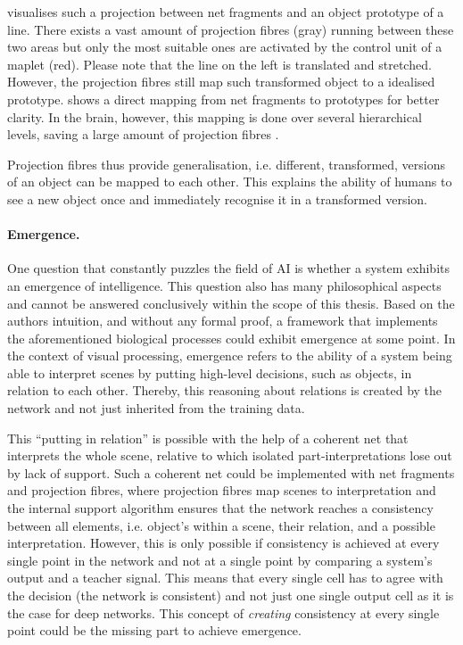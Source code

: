  visualises such a projection between net fragments and an object prototype of a line. There exists a vast amount of projection fibres (gray) running between these two areas but only the most suitable ones are activated by the control unit of a maplet (red).
Please note that the line on the left is translated and stretched. However, the projection fibres still map such transformed object to a idealised prototype.
 shows a direct mapping from net fragments to prototypes for better clarity. In the brain, however, this mapping is done over several hierarchical levels, saving a large amount of projection fibres .

Projection fibres thus provide generalisation, i.e. different, transformed, versions of an object can be mapped to each other. This explains the ability of humans to see a new object once and immediately recognise it in a transformed version.

\paragraph{Emergence.} One question that constantly puzzles the field of AI is whether a system exhibits an emergence of intelligence.
This question also has many philosophical aspects and cannot be answered conclusively within the scope of this thesis.
Based on the authors intuition, and without any formal proof, a framework that implements the aforementioned biological processes could exhibit emergence at some point.
In the context of visual processing, emergence refers to the ability of a system being able to interpret scenes by putting high-level decisions, such as objects, in relation to each other. Thereby, this reasoning about relations is created by the network and not just inherited from the training data.

This ``putting in relation'' is possible with the help of a coherent net that interprets the whole scene, relative to which isolated part-interpretations lose out by lack of support. Such a coherent net could be implemented with net fragments and projection fibres, where projection fibres map scenes to interpretation and the internal support algorithm ensures that the network reaches a consistency between all elements, i.e. object's within a scene, their relation, and a possible interpretation.
However, this is only possible if consistency is achieved at every single point in the network and not at a single point by comparing a system's output and a teacher signal.
This means that every single cell has to agree with the decision (the network is consistent) and not just one single output cell as it is the case for deep networks.
This concept of \emph{creating} consistency at every single point could be the missing part to achieve emergence.


